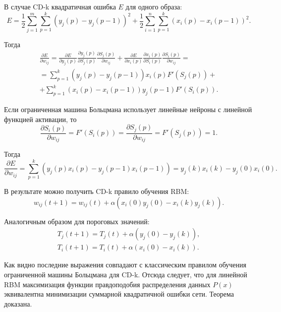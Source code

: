В случае CD-k квадратичная ошибка $E$ для одного образа:
\begin{equation*}
E=\frac{1}{2}\sum_{j=1}^m\sum_{p=1}^k (y_j(p)-y_j(p-1))^2+\frac{1}{2}\sum_{i=1}^n\sum_{p=1}^k (x_i(p)-x_i(p-1))^2.
\end{equation*}

Тогда
\begin{multline*}
    \frac{\partial E}{\partial w_{ij}}=\frac{\partial E}{\partial y_j(p)}\frac{\partial y_j(p)}{\partial S_j(p)}\frac{\partial S_j(p)}{\partial w_{ij}}+\frac{\partial E}{\partial x_i(p)}\frac{\partial x_i(p)}{\partial S_i(p)}\frac{\partial S_i(p)}{\partial w_{ij}}=\\=\sum_{p=1}^k (y_j(p)-y_j(p-1))x_i(p)F'(S_j(p))+\\+\sum_{p=1}^k (x_i(p)-x_i(p-1))y_j(p-1)F'(S_i(p)).
\end{multline*}

Если ограниченная машина Больцмана использует линейные нейроны с линейной функцией активации, то
\begin{equation*}
    \frac{\partial S_i(p)}{\partial w_{ij}}=F'(S_i(p))=\frac{\partial S_j(p)}{\partial w_{ij}}=F'(S_j(p))=1.
\end{equation*}

Тогда
\begin{equation*}
    \frac{\partial E}{\partial w_{ij}}=\sum_{p=1}^k (y_j(p)x_i(p)-y_j(p-1)x_i(p-1))=y_j(k)x_i(k)-y_j(0)x_i(0).
\end{equation*}

В результате можно получить CD-k правило обучения RBM:
\begin{equation*}
    w_{ij}(t+1)=w_{ij}(t)+\alpha(x_i(0)y_j(0)-x_i(k)y_j(k)).
\end{equation*}

Аналогичным образом для пороговых значений:
\begin{equation*}
\begin{aligned}
    T_{j}(t+1)=T_{j}(t)+\alpha(y_j(0)-y_j(k)),\\
    T_{i}(t+1)=T_{i}(t)+\alpha(x_i(0)-x_i(k)).
\end{aligned}
\end{equation*}

Как видно последние выражения совпадают с классическим правилом обучения ограниченной машины Больцмана для CD-k. Отсюда следует, что для линейной RBM максимизация функции правдоподобия распределения данных $P(x)$ эквивалентна минимизации суммарной квадратичной ошибки сети. Теорема доказана.

